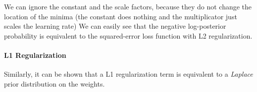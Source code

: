We can ignore the constant and the scale factors, because they do not change the location of the minima (the constant does nothing and the multiplicator just scales the learning rate)
We can easily see that the negative log-posterior probability is equivalent to the squared-error loss function with L2 regularization.

\paragraph{L1 Regularization}
Similarly, it can be shown that a L1 regularization term is equivalent to a \textit{Laplace} prior distribution on the weights.
